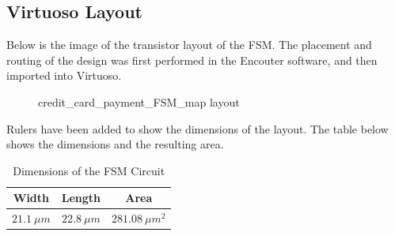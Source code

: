 \documentclass[12pt]{article}
\begin{document}
\subsection{Virtuoso Layout} %
Below is the image of the transistor layout of the FSM. The placement and routing of the design was first performed in the Encouter software, and then imported into Virtuoso.
\begin{figure} [H]
    \centering
    \caption{credit\_card\_payment\_FSM\_map layout}
\end{figure}

Rulers have been added to show the dimensions of the layout. The table below shows the dimensions and the resulting area.
\begin{table} [H]
    \centering
    \begin{tabular}{ccc}
        Width & Length &  Area\\
        \hline
        $\SI{21.1}{\mu m}$ & $\SI{22.8}{\mu m}$ & $\SI{281.08}{\mu m^2}$
    \end{tabular}
    \caption{Dimensions of the FSM Circuit}
\end{table}
\end{document}
